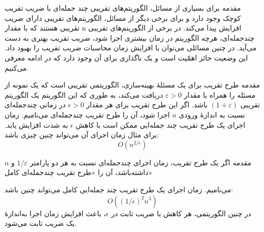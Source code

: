 \begin{itemframe}{مقدمه}
\itm
برای بسیاری از مسائل، الگوریتم‌های تقریبی چند جمله‌ای با ضریب تقریب کوچک وجود دارد و برای برخی دیگر از مسائل، الگوریتم‌های تقریبی دارای ضریب تقریبی هستند که با مقدار n افزایش پیدا می‌کند.
\itm
در برخی از الگوریتم‌های تقریبی چندجمله‌ای، هرچه الگوریتم در زمان بیشتری اجرا شود، ضریب تقریب بهتری به دست می‌آید. در چنین مسائلی می‌توان با افزایش زمان محاسبات ضریب تقریب را بهبود داد.
\itm
این وضعیت حائز اهمّیت است و یک ناگذاری برای آن وجود دارد که در ادامه معرفی می‌کنیم.
\end{itemframe}

\begin{itemframe}{مقدمه}
\itm
طرح تقریب
برای یک مسئلهٔ بهینه‌سازی، الگوریتمی تقریبی است که یک نمونه از مسئله را همراه با مقدار
$\varepsilon > 0$
دریافت می‌کند، به طوری که این الگوریتم یک الگوریتم تقریبی
$(1 + \varepsilon)$
 باشد.
\itm
اگر این طرح تقریب برای هر مقدار
$\epsilon > 0$
در زمانی چندجمله‌ای نسبت به اندازهٔ ورودی $n$ اجرا شود، آن را طرح تقریب چندجمله‌ای
 می‌نامیم.
\itm
زمان اجرای یک طرح تقریب چند جمله‌ایی ممکن است با کاهش
$\epsilon$
 به شدت افزایش یابد. برای مثال زمان اجرای آن می‌تواند چنین چیزی باشد:
$$
O(n^{2/\epsilon})
$$
\end{itemframe}

\begin{itemframe}{مقدمه}
\itm
اگر یک طرح تقریب، زمان اجرای چندجمله‌ای نسبت به هر دو پارامتر
$1/\varepsilon$
و $n$ داشته‌باشد، آن را «طرح تقریب چندجمله‌ای کامل»

می‌نامیم. زمان اجرای یک طرح تقریب چند جمله‌ایی کامل می‌تواند چنین باشد:
$$
O((1/\epsilon)^2n^3)
$$
\itm
در چنین الگوریتمی، هر کاهش با ضریب ثابت در $\epsilon$، باعث افزایش زمان اجرا به‌اندازهٔ یک ضریب ثابت می‌شود.
\end{itemframe}
